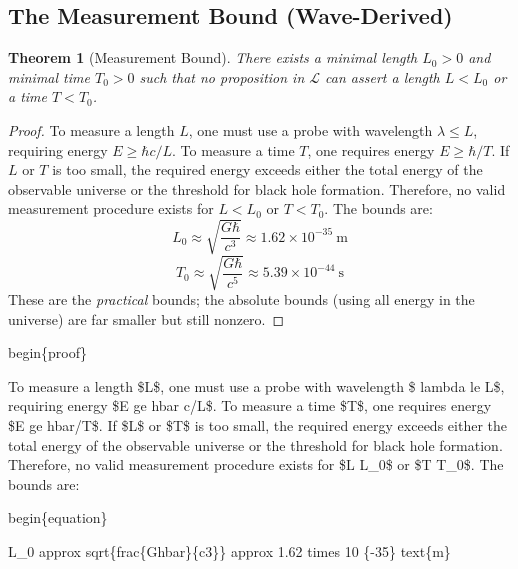 \documentclass[aps,preprint,showpacs,showkeys]{revtex4}%
\newtheorem{theorem}{Theorem}
\begin{document}
\subsection{The Measurement Bound (Wave-Derived)}

\begin{theorem}[Measurement Bound]
There exists a minimal length $L_0 > 0$ and minimal time $T_0 > 0$ such that
no proposition in $\mathcal{L}$ can assert a length $L < L_0$ or a time $T <
T_0$.
\end{theorem}

\begin{proof}
To measure a length $L$, one must use a probe with wavelength $\lambda \le L$, requiring energy $E \ge \hbar c/L$. To measure a time $T$, one requires energy $E \ge \hbar/T$. If $L$ or $T$ is too small, the required energy exceeds either the total energy of the observable universe or the threshold for black hole formation. Therefore, no valid measurement procedure exists for $L < L_0$ or $T < T_0$. The bounds are:
\begin{equation}
L_0 \approx \sqrt{\frac{G\hbar}{c^3}} \approx 1.62 \times 10^{-35}\ \text{m}
\end{equation}
\begin{equation}
T_0 \approx \sqrt{\frac{G\hbar}{c^5}} \approx 5.39 \times 10^{-44}\ \text{s}
\end{equation}
These are the \emph{practical} bounds; the absolute bounds (using all energy in the universe) are far smaller but still nonzero.
\end{proof}\TEXTsymbol{\backslash}begin\{proof\}

To measure a length \$L\$, one must use a probe with wavelength \$%
\TEXTsymbol{\backslash}lambda \TEXTsymbol{\backslash}le L\$, requiring
energy \$E \TEXTsymbol{\backslash}ge \TEXTsymbol{\backslash}hbar c/L\$. To
measure a time \$T\$, one requires energy \$E \TEXTsymbol{\backslash}ge 
\TEXTsymbol{\backslash}hbar/T\$. If \$L\$ or \$T\$ is too small, the
required energy exceeds either the total energy of the observable universe
or the threshold for black hole formation. Therefore, no valid measurement
procedure exists for \$L \TEXTsymbol{<} L\_0\$ or \$T \TEXTsymbol{<} T\_0\$.
The bounds are:

\TEXTsymbol{\backslash}begin\{equation\}

L\_0 \TEXTsymbol{\backslash}approx \TEXTsymbol{\backslash}sqrt\{\TEXTsymbol{%
\backslash}frac\{G\TEXTsymbol{\backslash}hbar\}\{c3\}\} 
\TEXTsymbol{\backslash}approx 1.62 \TEXTsymbol{\backslash}times 10%
\{-35\}\TEXTsymbol{\backslash} \TEXTsymbol{\backslash}text\{m\}
\end{document}

